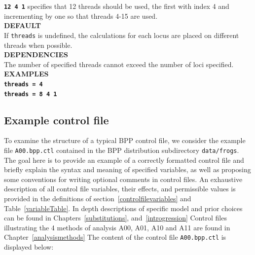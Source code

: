 \documentclass[a4paper]{book}
\numberwithin{equation}{section} \renewcommand{\baselinestretch}{0.55}
\begin{document}
\textbf{\texttt{12 4 1}} specifies that 12 threads should be used, the first with index 4 and incrementing
by one so that threads 4-15 are used.
\vspace{5pt}\\
\textbf{DEFAULT} \vspace{5pt}\\
If \texttt{threads} is undefined, the calculations for each locus are placed on different threads when possible.  
\vspace{5pt}\\
\textbf{DEPENDENCIES} \vspace{5pt}\\
The number of specified threads cannot exceed the number of loci specified. \vspace{5pt}\\
\textbf{EXAMPLES} \vspace{5pt}\\
\textbf{\texttt{threads = 4}} \vspace{5pt}\\
\textbf{\texttt{threads = 8 4 1}} \vspace{5pt}\\


\subsection{Example control file} \label{examplecontrolfile}
To examine the structure of a typical BPP control file, we consider
the example file \texttt{A00.bpp.ctl} contained in the BPP
distribution subdirectory \texttt{data/frogs}.  The goal here is to
provide an example of a correctly formatted control file and briefly
explain the syntax and meaning of specified variables, as well as
proposing some conventions for writing optional comments in control
files.  An exhaustive description of all control file variables, their
effects, and permissible values is provided in the definitions of
section~\ref{controlfilevariables} and Table~\ref{variableTable}.  In
depth descriptions of specific model and prior choices can be found in
Chapters~\ref{substitutions}, and~\ref{introgression}  Control files illustrating the 4
methods of analysis A00, A01, A10 and A11 are found in
Chapter~\ref{analysismethods} The content of the control file
\texttt{A00.bpp.ctl} is displayed below:
\end{document}
